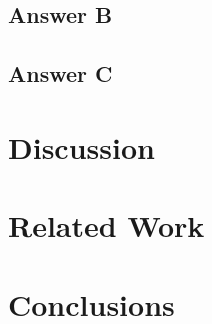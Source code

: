 \subsection{Answer B}

\subsection{Answer C}





\section{Discussion} \label{sec:discussion3}


\section{Related Work} \label{sec:rw}


\section{Conclusions} \label{sec:conc}

